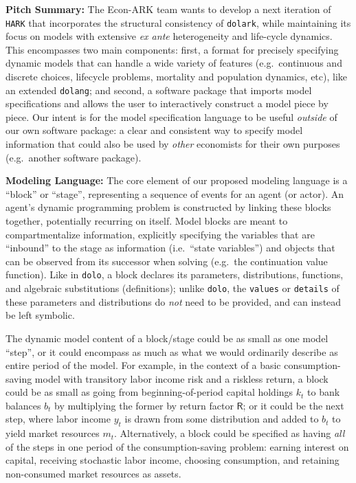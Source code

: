 \documentclass[12pt,pdftex,letterpaper]{article}
\begin{document}
\noindent \textbf{Pitch Summary:} The Econ-ARK team wants to develop a next iteration of \texttt{HARK} that incorporates the structural consistency of \texttt{dolark}, while maintaining its focus on models with extensive \textit{ex ante} heterogeneity and life-cycle dynamics. This encompasses two main components: first, a format for precisely specifying dynamic models that can handle a wide variety of features (e.g.\ continuous and discrete choices, lifecycle problems, mortality and population dynamics, etc), like an extended \texttt{dolang}; and second, a software package that imports model specifications and allows the user to interactively construct a model piece by piece. Our intent is for the model specification language to be useful \textit{outside} of our own software package: a clear and consistent way to specify model information that could also be used by \textit{other} economists for their own purposes (e.g.\ another software package).

\vspace{0.35cm}

\noindent \textbf{Modeling Language:} The core element of our proposed modeling language is a ``block'' or ``stage'', representing a sequence of events for an agent (or actor). An agent's dynamic programming problem is constructed by linking these blocks together, potentially recurring on itself. Model blocks are meant to compartmentalize information, explicitly specifying the variables that are ``inbound'' to the stage as information (i.e.\ ``state variables'') and objects that can be observed from its successor when solving (e.g.\ the continuation value function). Like in \texttt{dolo}, a block declares its parameters, distributions, functions, and algebraic substitutions (definitions); unlike \texttt{dolo}, the \texttt{values} or \texttt{details} of these parameters and distributions do \textit{not} need to be provided, and can instead be left symbolic.

The dynamic model content of a block/stage could be as small as one model ``step'', or it could encompass as much as what we would ordinarily describe as entire period of the model. For example, in the context of a basic consumption-saving model with transitory labor income risk and a riskless return, a block could be as small as going from beginning-of-period capital holdings $k_t$ to bank balances $b_t$ by multiplying the former by return factor $\mathsf{R}$; or it could be the next step, where labor income $y_t$ is drawn from some distribution and added to $b_t$ to yield market resources $m_t$. Alternatively, a block could be specified as having \textit{all} of the steps in one period of the consumption-saving problem: earning interest on capital, receiving stochastic labor income, choosing consumption, and retaining non-consumed market resources as assets.
\end{document}
